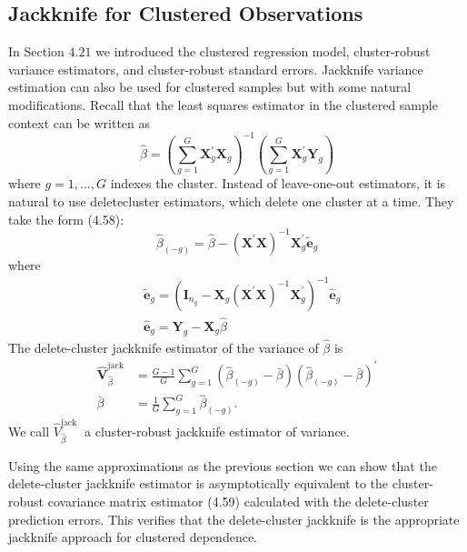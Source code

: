 \documentclass[10pt]{article}
\begin{document}
\subsection{Jackknife for Clustered Observations}
In Section $4.21$ we introduced the clustered regression model, cluster-robust variance estimators, and cluster-robust standard errors. Jackknife variance estimation can also be used for clustered samples but with some natural modifications. Recall that the least squares estimator in the clustered sample context can be written as
$$
\widehat{\beta}=\left(\sum_{g=1}^{G} \boldsymbol{X}_{g}^{\prime} \boldsymbol{X}_{g}\right)^{-1}\left(\sum_{g=1}^{G} \boldsymbol{X}_{g}^{\prime} \boldsymbol{Y}_{g}\right)
$$
where $g=1, \ldots, G$ indexes the cluster. Instead of leave-one-out estimators, it is natural to use deletecluster estimators, which delete one cluster at a time. They take the form (4.58):
$$
\widehat{\beta}_{(-g)}=\widehat{\beta}-\left(\boldsymbol{X}^{\prime} \boldsymbol{X}\right)^{-1} \boldsymbol{X}_{g}^{\prime} \widetilde{\boldsymbol{e}}_{g}
$$
where
$$
\begin{aligned}
&\widetilde{\boldsymbol{e}}_{g}=\left(\boldsymbol{I}_{n_{g}}-\boldsymbol{X}_{g}\left(\boldsymbol{X}^{\prime} \boldsymbol{X}\right)^{-1} \boldsymbol{X}_{g}^{\prime}\right)^{-1} \widehat{\boldsymbol{e}}_{g} \\
&\widehat{\boldsymbol{e}}_{g}=\boldsymbol{Y}_{g}-\boldsymbol{X}_{g} \widehat{\beta}
\end{aligned}
$$
The delete-cluster jackknife estimator of the variance of $\widehat{\beta}$ is
$$
\begin{aligned}
\widehat{\boldsymbol{V}}_{\widehat{\beta}}^{\mathrm{jack}} &=\frac{G-1}{G} \sum_{g=1}^{G}\left(\widehat{\beta}_{(-g)}-\bar{\beta}\right)\left(\widehat{\beta}_{(-g)}-\bar{\beta}\right)^{\prime} \\
\bar{\beta} &=\frac{1}{G} \sum_{g=1}^{G} \widehat{\beta}_{(-g)} .
\end{aligned}
$$
We call $\widehat{V}_{\widehat{\beta}}^{\text {jack }}$ a cluster-robust jackknife estimator of variance.

Using the same approximations as the previous section we can show that the delete-cluster jackknife estimator is asymptotically equivalent to the cluster-robust covariance matrix estimator (4.59) calculated with the delete-cluster prediction errors. This verifies that the delete-cluster jackknife is the appropriate jackknife approach for clustered dependence.
\end{document}
